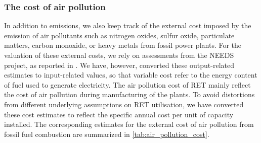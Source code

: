 \documentclass[review, 3p, times, 12pt, authoryear]{elsarticle}
\begin{document}
    \subsubsection{The cost of air pollution}
    In addition to  emissions, we also keep track of the external cost imposed by the emission of air pollutants such as nitrogen oxides, sulfur oxide, particulate matters, carbon monoxide, or heavy metals from fossil power plants.
    For the valuation of these external costs, we rely on assessments from the NEEDS project, as reported in \cite{Samadi2017}.
    We have, however, converted these output-related estimates to input-related values, so that variable cost refer to the energy content of fuel used to generate electricity.
    The air pollution cost of RET mainly reflect the cost of air pollution during manufacturing of the plants.
    To avoid distortions from different underlying assumptions on RET utilisation, we have converted these cost estimates to reflect the specific annual cost per unit of capacity installed.
    The corresponding estimates for the external cost of air pollution from fossil fuel combustion are summarized in \autoref{tab:air_pollution_cost}.
\end{document}
